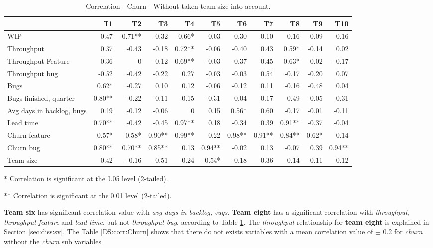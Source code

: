 \documentclass[UKenglish]{ifimaster}  %
\begin{document}
\begin{minipage}[t]{\linewidth}
\begin{table}[H]
 \begin{adjustwidth}{-2.5cm}{}
 \centering
 \begin{tabular}{|l|r|r|r|r|r|r|r|r|r|r|}
\hline
 & \bf{T1} & \bf{T2} & \bf{T3} & \bf{T4} & \bf{T5} & \bf{T6} & \bf{T7} & \bf{T8} & \bf{T9} & \bf{T10}\\ \hline
 WIP  & 0.47 & -0.71** & -0.32 & 0.66* & 0.03 & -0.30 & 0.10 & 0.16 & -0.09 & 0.16 \\ \hline
 Throughput  & 0.37 & -0.43 & -0.18 & 0.72** & -0.06 & -0.40 & 0.43 & 0.59* & -0.14 & 0.02 \\ \hline
 Throughput Feature  & 0.36 & 0 &-0.12 & 0.69** & -0.03 & -0.37 & 0.45 & 0.63* & 0.02 & -0.17 \\ \hline
 Throughput bug  & -0.52 & -0.42 & -0.22 & 0.27 & -0.03 & -0.03 & 0.54 & -0.17 & -0.20 & 0.07 \\ \hline
 Bugs  & 0.62* & -0.27 & 0.10 & 0.12 & -0.06 & -0.12 & 0.11 & -0.16 & -0.48 & 0.04 \\ \hline
 Bugs finished, quarter  & 0.80** & -0.22 & -0.11 & 0.15 & -0.31 & 0.04 & 0.17 & 0.49 & -0.05 & 0.31 \\ \hline
 Avg days in backlog, bugs  & 0.19 & -0.12 & -0.06 & 0 &0.15 & 0.56* & 0.60 & -0.17 & -0.01 & -0.11 \\ \hline
 Lead time  & 0.70** & -0.42 & -0.45 & 0.97** & 0.18 & -0.34 & 0.39 & 0.91** & -0.37 & -0.04 \\ \hline
 Churn feature  & 0.57* & 0.58* & 0.90** & 0.99** & 0.22 & 0.98** & 0.91** & 0.84** & 0.62* & 0.14 \\ \hline
 Churn bug  & 0.80** & 0.70** & 0.85** & 0.13 & 0.94** & -0.02 & 0.13 & -0.07 & 0.39 & 0.94** \\ \hline
 Team size  & 0.42 & -0.16 & -0.51 & -0.24 & -0.54* & -0.18 & 0.36 & 0.14 & 0.11 & 0.12 \\ \hline
\end{tabular}
 \caption{Correlation - Churn - Without taken team size into account.}
 \label{corr:churn}
 \centerline {* Correlation is significant at the 0.05 level (2-tailed).}
\centerline{** Correlation is significant at the 0.01 level (2-tailed).}
\end{adjustwidth}
\end{table}
\end{minipage}


\textbf{Team six} has significant correlation value with \textit{avg days in backlog, bugs}. \textbf{Team eight} has a significant correlation with \textit{throughput, throughput feature} and \textit{lead time}, but not \textit{throughput bug}, according to Table \ref{corr:churn}. The \textit{throughput} relationship for \textbf{team eight} is explained in Section \ref{sec:diss:sv}. The Table \ref{DS:corr:Churn} shows that there do not exists variables with a mean correlation value of $\pm$ 0.2 for \textit{churn} without the \textit{churn} sub variables 
\end{document}
